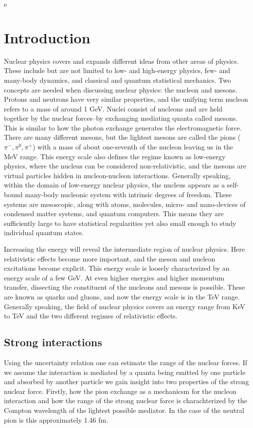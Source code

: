 e\chapter{Introduction}
Nuclear physics covers and expands different ideas from other areas of physics. These include but are not limited to low- and high-energy physics, few- and many-body dynamics, and classical and quantum statistical mechanics. Two concepts are needed when discussing nuclear physics: the nucleon and mesons. Protons and neutrons have very similar properties, and the unifying term nucleon refers to a mass of around 1 GeV. Nuclei consist of nucleons and are held together by the nuclear forces--by exchanging mediating quanta called mesons. This is similar to how the photon exchange generates the electromagnetic force. There are many different mesons, but the lightest mesons are called the pions ($\pi^-,\pi^0,\pi^+$) with a mass of about one-seventh of the nucleon leaving us in the MeV range. This energy scale also defines the regime known as low-energy physics, where the nucleus can be considered non-relativistic, and the mesons are virtual particles hidden in nucleon-nucleon interactions.
Generally speaking, within the domain of low-energy nuclear physics, the nucleus appears as a self-bound many-body nucleonic system with intrinsic degrees of freedom. These systems are mesoscopic, along with atoms, molecules, micro- and nano-devices of condensed matter systems, and quantum computers. This means they are sufficiently large to have statistical regularities yet also small enough to study individual quantum states.

 Increasing the energy will reveal the intermediate region of nuclear physics. Here relativistic effects become more important, and the meson and nucleon excitations become explicit. This energy scale is loosely characterized by an energy scale of a few GeV. At even higher energies and higher momentum transfer, dissecting the constituent of the nucleons and mesons is possible. These are known as quarks and gluons, and now the energy scale is in the TeV range. Generally speaking, the field of nuclear physics covers an energy range from KeV to TeV and the two different regimes of relativistic effects. 
\section{Strong interactions}
Using the uncertainty relation one can estimate the range of the nuclear forces. If we assume the interaction is mediated by a quanta being emitted by one particle and absorbed by another particle we gain insight into two properties of the strong nuclear force. Firstly, how the pion exchange as a mechanicsm for the nucleon interaction and how the range of the strong nuclear force is charachterized by the Compton wavelength of the lightest possible mediator. In the case of the neutral pion is this approximately 1.46 fm. 
